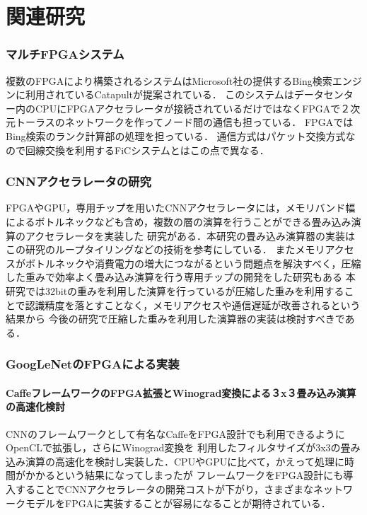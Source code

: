 \chapter{関連研究}
{
\label{chap:survey}

\subsection{マルチFPGAシステム}
複数のFPGAにより構築されるシステムはMicrosoft社の提供するBing検索エンジンに利用されているCatapult\cite{catapult1st}が提案されている．
このシステムはデータセンター内のCPUにFPGAアクセラレータが接続されているだけではなくFPGAで２次元トーラスのネットワークを作ってノード間の通信も担っている．
FPGAではBing検索のランク計算部の処理を担っている．
通信方式はパケット交換方式なので回線交換を利用するFiCシステムとはこの点で異なる．

\subsection{CNNアクセラレータの研究}
FPGAやGPU，専用チップを用いたCNNアクセラレータには，メモリバンド幅によるボトルネックなども含め，複数の層の演算を行うことができる畳み込み演算のアクセラレータを実装した
研究\cite{optimized}がある．本研究の畳み込み演算器の実装はこの研究のループタイリングなどの技術を参考にしている．
またメモリアクセスがボトルネックや消費電力の増大につながるという問題点を解決すべく，圧縮した重みで効率よく畳み込み演算を行う専用チップの開発をした研究もある\cite{EIE}
本研究では32bitの重みを利用した演算を行っているが圧縮した重みを利用することで認識精度を落とすことなく，メモリアクセスや通信遅延が改善されるという結果から
今後の研究で圧縮した重みを利用した演算器の実装は検討すべきである．

\subsection{GoogLeNetのFPGAによる実装}

\subsubsection{CaffeフレームワークのFPGA拡張とWinograd変換による３x３畳み込み演算の高速化検討\cite{caffeinated}}
CNNのフレームワークとして有名なCaffeをFPGA設計でも利用できるようにOpenCLで拡張し，さらにWinograd変換を
利用したフィルタサイズが3x3の畳み込み演算の高速化を検討し実装した．CPUやGPUに比べて，かえって処理に時間がかかるという結果になってしまったが
フレームワークをFPGA設計にも導入することでCNNアクセラレータの開発コストが下がり，さまざまなネットワークモデルをFPGAに実装することが容易になることが期待されている．

}
